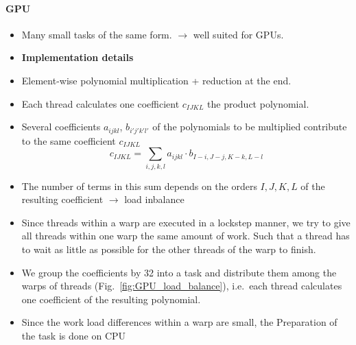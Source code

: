 \documentclass[oribibl]{llncs2e/llncs}
\begin{document}
\paragraph{GPU}
\begin{itemize}
\item Many small tasks of the same form. $\rightarrow$ well suited for GPUs.
\item {\bf Implementation details}
\item Element-wise polynomial multiplication + reduction at the end.
\item Each thread calculates one coefficient $c_{IJKL}$ the product polynomial.
\item Several coefficients $a_{ijkl}$, $b_{i'j'k'l'}$ of the polynomials to be multiplied contribute to the same coefficient $c_{IJKL}$
\begin{equation}
    c_{IJKL} = \sum_{i,j,k,l} a_{ijkl} \cdot b_{I-i,J-j,K-k,L-l}
\end{equation}
\item The number of terms in this sum depends on the orders $I,J,K,L$ of the resulting coefficient $\rightarrow$ load inbalance
\item Since threads within a warp are executed in a lockstep manner, we try to give all threads within one warp the same amount of work. Such that a thread has to wait as little as possible for the other threads of the warp to finish.
\item We group the coefficients by 32 into a task and distribute them among the warps of threads (Fig.\ \ref{fig:GPU_load_balance}), i.e.\ each thread calculates one coefficient of the resulting polynomial.
\item Since the work load differences within a warp are small, the 
{\color{blue} Preparation of the task is done on CPU}


\end{itemize}
\end{document}
